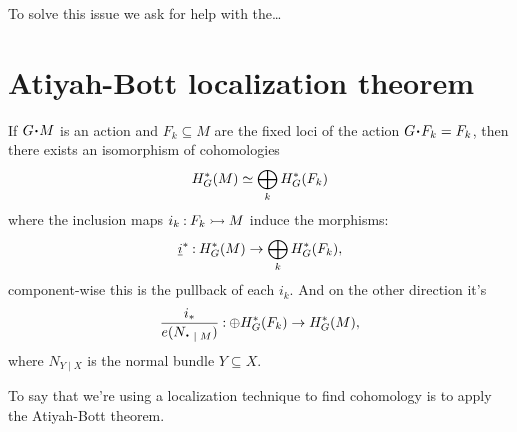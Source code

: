 \documentclass[12pt]{memoir}
\begin{document}
To solve this issue we ask for help with the\dots

\section{Atiyah-Bott localization theorem}

\begin{Th}
    If $G\.M$ is an action and $F_k\subseteq M$ are the fixed loci of the action $G\.F_k=F_k$, then there exists an isomorphism of cohomologies
    $$H^\ast_G(M)\simeq \bigoplus_kH^\ast_G(F_k)$$
    where the inclusion maps $i_k\mathbin{:} F_k\rightarrowtail M$ induce the morphisms:
    $$\underline{i}^\ast\mathbin{:}H^\ast_G(M)\to\bigoplus_kH^\ast_G(F_k),$$
    component-wise this is the pullback of each $i_k$. And on the other direction it's
 $$\frac{i_\ast}{e(N_{\.\mid M})}\:\oplus H^\ast_G(F_k)\to H^\ast_G(M),$$ 
 where $N_{Y\mid X}$ is the normal bundle $Y\subseteq X$.
\end{Th}

To say that we're using a localization technique to find cohomology is to apply the Atiyah-Bott theorem.
\end{document}
